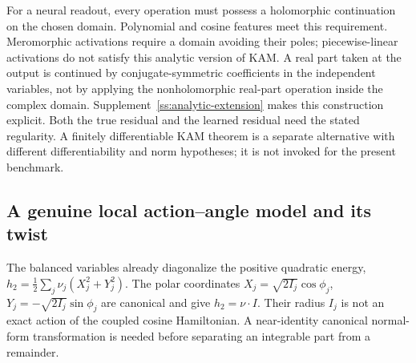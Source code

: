 For a neural readout, every operation must possess a holomorphic continuation on the chosen domain. Polynomial and cosine features meet this requirement. Meromorphic activations require a domain avoiding their poles; piecewise-linear activations do not satisfy this analytic version of KAM. A real part taken at the output is continued by conjugate-symmetric coefficients in the independent variables, not by applying the nonholomorphic real-part operation inside the complex domain. Supplement~\ref{ss:analytic-extension} makes this construction explicit. Both the true residual and the learned residual need the stated regularity. A finitely differentiable KAM theorem is a separate alternative with different differentiability and norm hypotheses; it is not invoked for the present benchmark.

\subsection{A genuine local action--angle model and its twist}
\label{kam:normalform-section}

The balanced variables already diagonalize the positive quadratic energy, $h_2=\tfrac12\sum_j\nu_j(X_j^2+Y_j^2)$. The polar coordinates
$X_j=\sqrt{2I_j}\cos\phi_j$,
$Y_j=-\sqrt{2I_j}\sin\phi_j$
are canonical and give $h_2=\nu\cdot I$. Their radius $I_j$ is not an exact action of the coupled cosine Hamiltonian. A near-identity canonical normal-form transformation is needed before separating an integrable part from a remainder.

